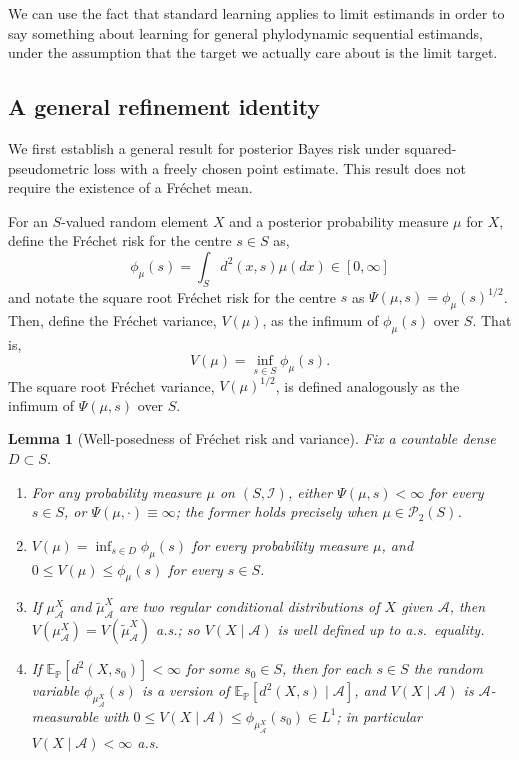 \documentclass{article}
\newcommand{\E}{\mathbb{E}_{\mathbb{P}}}
\newcommand{\I}{\mathcal{I}}
\newcommand{\1}{\mathbbm{1}}
\newtheorem{lemma}{Lemma}
\begin{document}
We can use the fact that standard learning applies to limit estimands in order to say something about learning for general phylodynamic sequential estimands, under the assumption that the target we actually care about is the limit target. 

\subsection{A general refinement identity}

We first establish a general result for posterior Bayes risk under
squared-pseudometric loss with a freely chosen point estimate. This result
does not require the existence of a Fr\'echet mean.

For an $S$-valued random element $X$ and a posterior probability measure $\mu$ for $X$, define the Fr\'echet risk for the centre $s\in S$ as,  
\[
\phi_\mu(s)=\int_S d^2(x,s)\mu(dx)\in[0,\infty]
\]
and notate the square root Fr\'echet risk for the centre $s$ as $\Psi(\mu,s)=\phi_\mu(s)^{1/2}$. Then, define the Fr\'echet variance, $V(\mu)$, as the infimum of $\phi_\mu(s)$ over $S$. That is, 
\[
V(\mu)=\inf_{s\in S} \phi_\mu(s).
\]
The square root Fr\'echet variance, $V(\mu)^{1/2}$, is defined analogously as the infimum of $\Psi(\mu,s)$ over $S$.

\begin{lemma}[Well-posedness of Fr\'echet risk and variance]
\label{Vwellposed}
Fix a countable dense $D\subset S$.
\begin{enumerate}
\item[(i)] For any probability measure $\mu$ on $(S,\I)$, either $\Psi(\mu,s)<\infty$ for every
$s\in S$, or $\Psi(\mu,\cdot)\equiv\infty$; the former holds precisely when $\mu\in\mathcal{P}_2(S)$.
\item[(ii)] $V(\mu)=\inf_{s\in D}\phi_\mu(s)$ for every probability measure $\mu$, and
$0\le V(\mu)\le\phi_\mu(s)$ for every $s\in S$.
\item[(iii)] If $\mu^X_\mathcal{A}$ and $\tilde\mu^X_\mathcal{A}$ are two regular conditional
distributions of $X$ given $\mathcal{A}$, then $V(\mu^X_\mathcal{A})=V(\tilde\mu^X_\mathcal{A})$
a.s.; so $V(X\mid\mathcal{A})$ is well defined up to a.s.\ equality.
\item[(iv)] If $\E[d^2(X,s_0)]<\infty$ for some $s_0\in S$, then for each $s\in S$ the random
variable $\phi_{\mu^X_\mathcal{A}}(s)$ is a version of $\E[d^2(X,s)\mid\mathcal{A}]$, and
$V(X\mid\mathcal{A})$ is $\mathcal{A}$-measurable with $0\le V(X\mid\mathcal{A})\le
\phi_{\mu^X_\mathcal{A}}(s_0)\in L^1$; in particular $V(X\mid\mathcal{A})<\infty$ a.s.
\end{enumerate}
\end{lemma}
\end{document}
